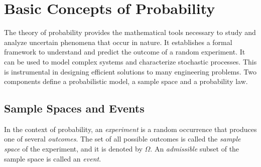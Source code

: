 \chapter{Basic Concepts of Probability}

The theory of probability provides the mathematical tools necessary to study and analyze uncertain phenomena that occur in nature.
It establishes a formal framework to understand and predict the outcome of a random experiment.
It can be used to model complex systems and characterize stochastic processes.
This is instrumental in designing efficient solutions to many engineering problems.
Two components define a probabilistic model, a sample space and a probability law.


\section{Sample Spaces and Events}

In the context of probability, an \emph{experiment} is a random occurrence that produces one of several \emph{outcomes}.
The set of all possible outcomes is called the \emph{sample space} of the experiment, and it is denoted by $\Omega$.
An \emph{admissible} subset of the sample space is called an \emph{event}.

